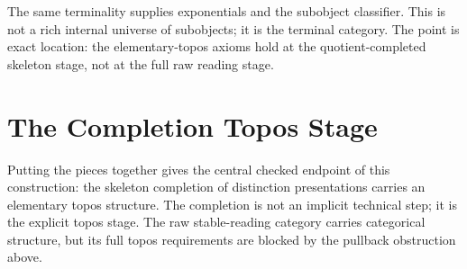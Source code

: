 \documentclass[11pt]{article}
\begin{document}
The same terminality supplies exponentials and the subobject classifier.
This is not a rich internal universe of subobjects; it is the terminal
category.  The point is exact location: the elementary-topos axioms hold
at the quotient-completed skeleton stage, not at the full raw reading
stage.

\section{The Completion Topos Stage}

Putting the pieces together gives the central checked endpoint of this
construction: the skeleton completion of distinction presentations
carries an elementary topos structure.  The completion is not an
implicit technical step; it is the explicit topos stage.  The raw
stable-reading category carries categorical structure, but its full
topos requirements are blocked by the pullback obstruction above.

\begin{center}
\end{center}
\end{document}
